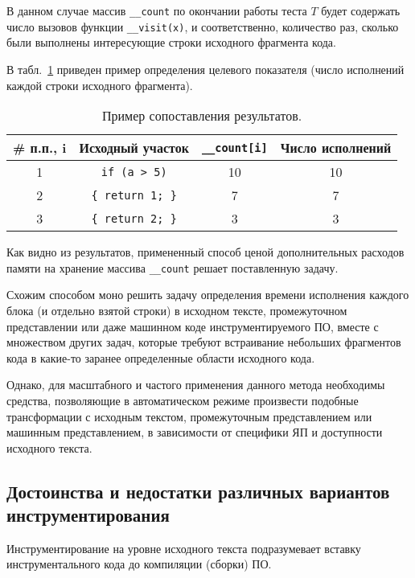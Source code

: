 В данном случае массив \lstinline{__count} по окончании работы теста $T$ будет содержать число вызовов функции \lstinline{__visit(x)}, и соответственно, количество раз, сколько были выполнены интересующие строки исходного фрагмента кода.

В табл.~\ref{table:insrtExampleResults} приведен пример определения целевого показателя (число исполнений каждой строки исходного фрагмента).
\begin{table}[H]
  \captionsetup{skip=5pt}
  \caption{Пример сопоставления результатов.}
  \label{table:insrtExampleResults}
  \centering
  \begin{tabular}{|c|c|c|c|}
    \hline
    \# п.п., i  & Исходный участок            & \lstinline!__count[i]!  & Число исполнений  \\ \hline
    1           & \lstinline!if (a > 5)!      & 10                      & 10                \\ \hline
    2           & \lstinline!{ return 1; }!   & 7                       & 7                 \\ \hline
    3           & \lstinline!{ return 2; }!   & 3                       & 3                 \\ \hline
  \end{tabular}
\end{table}

Как видно из результатов, примененный способ ценой дополнительных расходов памяти на хранение массива \lstinline{__count} решает поставленную задачу.

Схожим способом моно решить задачу определения времени исполнения каждого блока (и отдельно взятой строки) в исходном тексте, промежуточном представлении или даже машинном коде инструментируемого ПО, вместе с множеством других задач, которые требуют встраивание небольших фрагментов кода в какие-то заранее определенные области исходного кода.

Однако, для масштабного и частого применения данного метода необходимы средства, позволяющие в автоматическом режиме произвести подобные трансформации с исходным текстом, промежуточным представлением или машинным представлением, в зависимости от специфики ЯП и доступности исходного текста.

\subsection{Достоинства и недостатки различных вариантов инструментирования}
Инструментирование на уровне исходного текста подразумевает вставку инструментального кода до компиляции (сборки) ПО.

